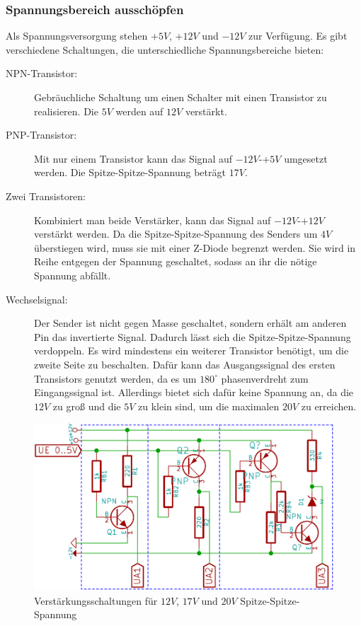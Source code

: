 \subsubsection{Spannungsbereich ausschöpfen}
Als Spannungsversorgung stehen $+5V$, $+12V$ und $-12V$ zur Verfügung. Es gibt verschiedene Schaltungen, die unterschiedliche Spannungsbereiche bieten:
\begin{description}
	\item[NPN-Transistor:] Gebräuchliche Schaltung um einen Schalter mit einen Transistor zu realisieren. Die $5V$ werden auf $12V$ verstärkt.
	\item[PNP-Transistor:] Mit nur einem Transistor kann das Signal auf $-12V$-$+5V$ umgesetzt werden. Die Spitze-Spitze-Spannung beträgt $17V$.
	\item[Zwei Transistoren:] Kombiniert man beide Verstärker, kann das Signal auf $-12V$-$+12V$ verstärkt werden. Da die Spitze-Spitze-Spannung des Senders um $4V$ überstiegen wird, muss sie mit einer Z-Diode begrenzt werden. Sie wird in Reihe entgegen der Spannung geschaltet, sodass an ihr die nötige Spannung abfällt.
	\item[Wechselsignal:] Der Sender ist nicht gegen Masse geschaltet, sondern erhält am anderen Pin das invertierte Signal. Dadurch lässt sich die Spitze-Spitze-Spannung verdoppeln. Es wird mindestens ein weiterer Transistor benötigt, um die zweite Seite zu beschalten. Dafür kann das Ausgangssignal des ersten Transistors genutzt werden, da es um $180^\circ$ phasenverdreht zum Eingangssignal ist. Allerdings bietet sich dafür keine Spannung an, da die $12V$ zu groß und die $5V$ zu klein sind, um die maximalen $20V$ zu erreichen.
\end{description}

\begin{figure}[H] %
\centering
\includegraphics[scale=0.6]{images/transistorschaltungen.png}
\caption{Verstärkungsschaltungen für $12V$, $17V$ und $20V$ Spitze-Spitze-Spannung} \label{img:I3}
\end{figure}

